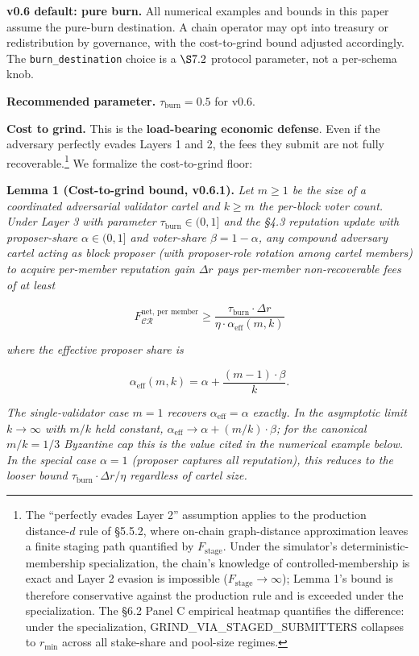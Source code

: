 \documentclass[
  11pt,
]{article}
\begin{document}
\textbf{v0.6 default: pure burn.} All numerical examples and bounds in
this paper assume the pure-burn destination. A chain operator may opt
into treasury or redistribution by governance, with the cost-to-grind
bound adjusted accordingly. The \texttt{burn\_destination} choice is a
\(\S 7.2\) protocol parameter, not a per-schema knob.

\textbf{Recommended parameter.} \(\tau_{\text{burn}} = 0.5\) for v0.6.

\textbf{Cost to grind.} This is the \textbf{load-bearing economic
defense}. Even if the adversary perfectly evades Layers 1 and 2, the
fees they submit are not fully recoverable.\footnote{The ``perfectly
  evades Layer 2'' assumption applies to the production distance-\(d\)
  rule of §5.5.2, where on-chain graph-distance approximation leaves a
  finite staging path quantified by \(F_{\text{stage}}\). Under the
  simulator's deterministic-membership specialization, the chain's
  knowledge of controlled-membership is exact and Layer 2 evasion is
  impossible (\(F_{\text{stage}} \to \infty\)); Lemma 1's bound is
  therefore conservative against the production rule and is exceeded
  under the specialization. The §6.2 Panel C empirical heatmap
  quantifies the difference: under the specialization,
  GRIND\_VIA\_STAGED\_SUBMITTERS collapses to \(r_{\min}\) across all
  stake-share and pool-size regimes.} We formalize the cost-to-grind
floor:

\textbf{Lemma 1 (Cost-to-grind bound, v0.6.1).} \emph{Let \(m \geq 1\)
be the size of a coordinated adversarial validator cartel and
\(k \geq m\) the per-block voter count. Under Layer 3 with parameter
\(\tau_{\text{burn}} \in (0, 1]\) and the §4.3 reputation update with
proposer-share \(\alpha \in (0, 1]\) and voter-share
\(\beta = 1 - \alpha\), any compound adversary cartel acting as block
proposer (with proposer-role rotation among cartel members) to acquire
per-member reputation gain \(\Delta r\) pays per-member non-recoverable
fees of at least}

\[F_{\mathcal{CR}}^{\text{net, per member}} \geq \frac{\tau_{\text{burn}} \cdot \Delta r}{\eta \cdot \alpha_{\text{eff}}(m, k)} \tag{Lemma 1}\]

\emph{where the effective proposer share is}

\[\alpha_{\text{eff}}(m, k) = \alpha + \frac{(m - 1) \cdot \beta}{k}.\]

\emph{The single-validator case \(m = 1\) recovers
\(\alpha_{\text{eff}} = \alpha\) exactly. In the asymptotic limit
\(k \to \infty\) with \(m / k\) held constant,
\(\alpha_{\text{eff}} \to \alpha + (m/k) \cdot \beta\); for the
canonical \(m / k = 1/3\) Byzantine cap this is the value cited in the
numerical example below. In the special case \(\alpha = 1\) (proposer
captures all reputation), this reduces to the looser bound
\(\tau_{\text{burn}} \cdot \Delta r / \eta\) regardless of cartel size.}
\end{document}
